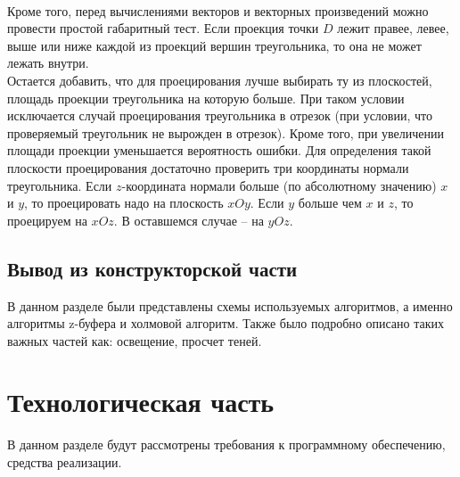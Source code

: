 \documentclass[a4paper, 10pt]{article}
\begin{document}
	\\ \hspace*{5mm} Кроме того, перед вычислениями векторов и векторных произведений можно провести простой габаритный тест. Если проекция точки $D$ лежит правее, левее, выше или ниже каждой из проекций вершин треугольника, то она не может лежать внутри.
	\\ \hspace*{5mm} Остается добавить, что для проецирования лучше выбирать ту из плоскостей, площадь проекции треугольника на которую больше. При таком условии исключается случай проецирования треугольника в отрезок (при условии, что проверяемый треугольник не вырожден в отрезок). Кроме того, при увеличении площади проекции уменьшается вероятность ошибки. Для определения такой плоскости проецирования достаточно проверить три координаты нормали треугольника. Если $z$-координата нормали больше (по абсолютному значению) $x$ и $y$, то проецировать надо на плоскость $xOy$. Если $y$ больше чем $x$ и $z$, то проецируем на $xOz$. В оставшемся случае – на $yOz$.
	\subsection{Вывод из конструкторской части}
	\hspace*{5mm} В данном разделе были представлены схемы используемых алгоритмов, а именно алгоритмы z-буфера и холмовой алгоритм. Также было подробно описано таких важных частей как: освещение, просчет теней.	 
\clearpage
\newpage
\section{Технологическая часть}
	\hspace*{5mm} В данном разделе будут рассмотрены требования к программному обеспечению, средства реализации.
\end{document}
